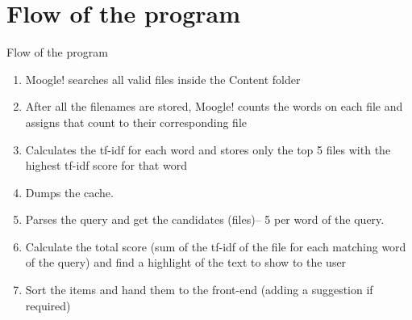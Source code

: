 \section{Flow of the program}

\begin{frame}[fragile]{Flow of the program}
    \begin{enumerate}
        \item{Moogle! searches all valid files inside the Content folder}
        \item{After all the filenames are stored, Moogle! counts the words on each file and assigns that count to their corresponding file}
        \item{Calculates the tf-idf for each word and stores only the top 5 files with the highest tf-idf score for that word}
        \item{Dumps the cache.}
        \item{Parses the query and get the candidates (files)-- 5 per word of the query.}
        \item{Calculate the total score (sum of the tf-idf of the file for each matching word of the query) and find a highlight of the text to show to the user}
        \item{Sort the items and hand them to the front-end (adding a suggestion if required)}
    \end{enumerate}
\end{frame}
